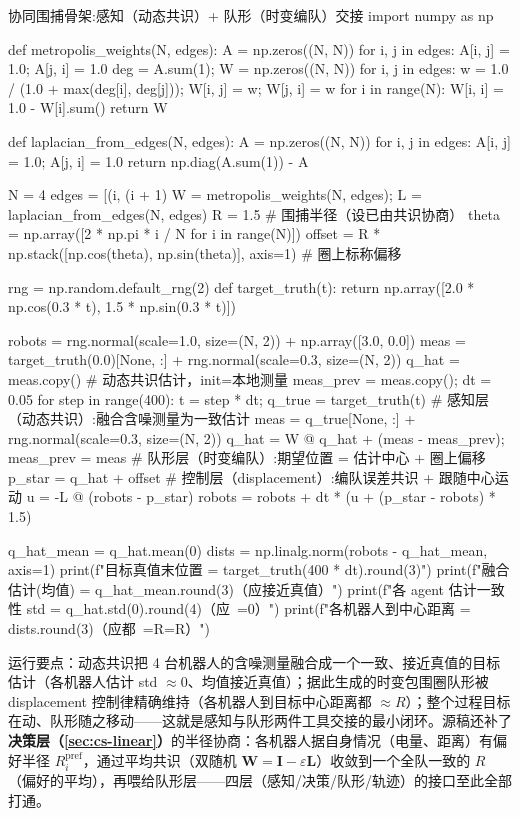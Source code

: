 \begin{codebox}[Python]{协同围捕骨架:感知（动态共识）+ 队形（时变编队）交接}
import numpy as np

def metropolis_weights(N, edges):
    A = np.zeros((N, N))
    for i, j in edges:
        A[i, j] = 1.0; A[j, i] = 1.0
    deg = A.sum(1); W = np.zeros((N, N))
    for i, j in edges:
        w = 1.0 / (1.0 + max(deg[i], deg[j])); W[i, j] = w; W[j, i] = w
    for i in range(N):
        W[i, i] = 1.0 - W[i].sum()
    return W

def laplacian_from_edges(N, edges):
    A = np.zeros((N, N))
    for i, j in edges:
        A[i, j] = 1.0; A[j, i] = 1.0
    return np.diag(A.sum(1)) - A

N = 4
edges = [(i, (i + 1) %
W = metropolis_weights(N, edges); L = laplacian_from_edges(N, edges)
R = 1.5                                                # 围捕半径（设已由共识协商）
theta = np.array([2 * np.pi * i / N for i in range(N)])
offset = R * np.stack([np.cos(theta), np.sin(theta)], axis=1)  # 圈上标称偏移

rng = np.random.default_rng(2)
def target_truth(t):
    return np.array([2.0 * np.cos(0.3 * t), 1.5 * np.sin(0.3 * t)])

robots = rng.normal(scale=1.0, size=(N, 2)) + np.array([3.0, 0.0])
meas = target_truth(0.0)[None, :] + rng.normal(scale=0.3, size=(N, 2))
q_hat = meas.copy()                                    # 动态共识估计，init=本地测量
meas_prev = meas.copy(); dt = 0.05
for step in range(400):
    t = step * dt; q_true = target_truth(t)
    # 感知层（动态共识）:融合含噪测量为一致估计
    meas = q_true[None, :] + rng.normal(scale=0.3, size=(N, 2))
    q_hat = W @ q_hat + (meas - meas_prev); meas_prev = meas
    # 队形层（时变编队）:期望位置 = 估计中心 + 圈上偏移
    p_star = q_hat + offset
    # 控制层（displacement）:编队误差共识 + 跟随中心运动
    u = -L @ (robots - p_star)
    robots = robots + dt * (u + (p_star - robots) * 1.5)

q_hat_mean = q_hat.mean(0)
dists = np.linalg.norm(robots - q_hat_mean, axis=1)
print(f"目标真值末位置 = {target_truth(400 * dt).round(3)}")
print(f"融合估计(均值) = {q_hat_mean.round(3)}（应接近真值）")
print(f"各 agent 估计一致性 std = {q_hat.std(0).round(4)}（应~=0）")
print(f"各机器人到中心距离 = {dists.round(3)}（应都~=R={R}）")
\end{codebox}

\noindent 运行要点：动态共识把 4 台机器人的含噪测量融合成一个一致、接近真值的目标估计（各机器人估计 std $\approx0$、均值接近真值）；据此生成的时变包围圈队形被 displacement 控制律精确维持（各机器人到目标中心距离都 $\approx R$）；整个过程目标在动、队形随之移动——这就是感知与队形两件工具交接的最小闭环。源稿还补了\textbf{决策层（\cref{sec:cs-linear}）}的半径协商：各机器人据自身情况（电量、距离）有偏好半径 $R_i^{\text{pref}}$，通过平均共识（双随机 $\mathbf{W}=\mathbf{I}-\varepsilon\mathbf{L}$）收敛到一个全队一致的 $R$（偏好的平均），再喂给队形层——四层（感知/决策/队形/轨迹）的接口至此全部打通。

